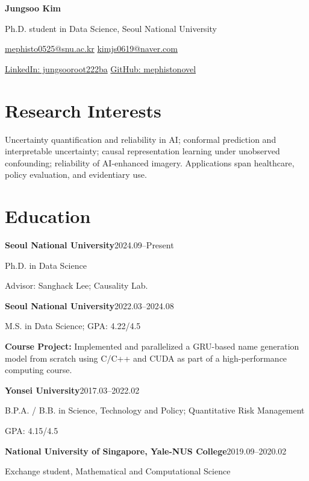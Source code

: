 \documentclass[a4paper,10pt]{article}
\newcommand{\entry}[2]{\textbf{#1}\hfill #2\par}
\begin{document}
{\LARGE\bfseries Jungsoo Kim}\par
\vspace{1pt}
Ph.D. student in Data Science, Seoul National University\par
\href{mailto:mephisto0525@snu.ac.kr}{mephisto0525@snu.ac.kr}\enspace\textbar\enspace
\href{mailto:kimjs0619@naver.com}{kimjs0619@naver.com}\par
\href{https://www.linkedin.com/in/jungsooroot222ba/}{LinkedIn: jungsooroot222ba}\enspace\textbar\enspace
\href{https://github.com/mephistonovel}{GitHub: mephistonovel}
\section{Research Interests}

Uncertainty quantification and reliability in AI; conformal prediction and interpretable uncertainty; causal representation learning under unobserved confounding; reliability of AI-enhanced imagery. Applications span healthcare, policy evaluation, and evidentiary use.
\section{Education}
\entry{Seoul National University}{2024.09--Present}
Ph.D. in Data Science\par
Advisor: Sanghack Lee; Causality Lab.\par
\vspace{1pt}
\entry{Seoul National University}{2022.03--2024.08}
M.S. in Data Science; GPA: 4.22/4.5\par
\textbf{Course Project:} Implemented and parallelized a GRU-based name generation model from scratch using C/C++ and CUDA as part of a high-performance computing course.\par
\vspace{1pt}
\entry{Yonsei University}{2017.03--2022.02}
B.P.A. / B.B. in Science, Technology and Policy; Quantitative Risk Management\par
GPA: 4.15/4.5\par
\vspace{1pt}
\entry{National University of Singapore, Yale-NUS College}{2019.09--2020.02}
Exchange student, Mathematical and Computational Science\par
\vspace{1pt}
\end{document}
